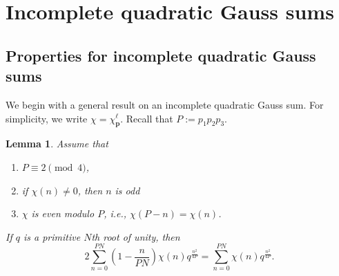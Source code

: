 \documentclass[11pt,reqno]{amsart}
\newtheorem{lemma}[theorem]{Lemma}
\theoremstyle{definition}
\numberwithin{equation}{section}
\renewcommand{\=}{\;=\;}
\begin{document}
\section{Incomplete quadratic Gauss sums}

\subsection{Properties for incomplete quadratic Gauss sums}

We begin with a general result on an incomplete quadratic Gauss sum. For simplicity, we write $\chi = \chi_{\bm{p}}^{\bm{\ell}}$. Recall that $P:=p_1 p_2 p_3$.

\begin{lemma} \label{chiprop} Assume that
\begin{enumerate}
\item[(i)] $P \equiv 2 \pmod{4}$, \\
\item[(ii)] if $\chi(n) \neq 0$, then $n$ is odd \\
\item[(iii)] $\chi$ is even modulo $P$, i.e., $\chi(P-n) = \chi(n)$.    
\end{enumerate} 
If $q$ is a primitive $N$th root of unity, then 
\begin{equation*}
2\sum_{n=0}^{PN} \left(1-\frac{n}{PN}\right) \chi(n) q^{\frac{n^2}{4P}} =  \sum_{n=0}^{PN} \chi(n) q^{\frac{n^2}{4P}}.
\end{equation*}
\end{lemma}
      
\end{document}
